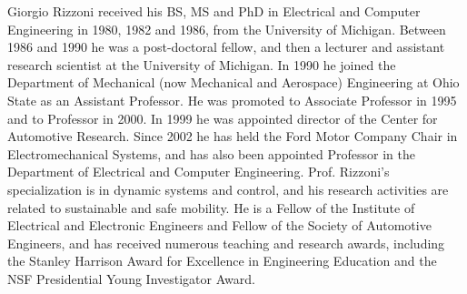 \documentclass[journal]{IEEEtran}
\begin{document}
\begin{IEEEbiography}[{\texttt{[image: GR]}}]{Giorgio Rizzoni} 
received his BS, MS and PhD in Electrical and Computer Engineering in 1980, 1982 and 1986, from the University of Michigan.  
Between 1986 and 1990 he was a post-doctoral fellow, and then a lecturer and assistant research scientist at the University of Michigan. In 1990 he joined the Department of Mechanical (now Mechanical and Aerospace) Engineering at Ohio State as an Assistant Professor. He was promoted to Associate Professor in 1995 and to Professor in 2000.  In 1999 he was appointed director of the Center for Automotive Research.  Since 2002 he has held the Ford Motor Company Chair in Electromechanical Systems, and has also been appointed Professor in the Department of Electrical and Computer Engineering. Prof. Rizzoni's specialization is in dynamic systems and control, and his research activities are related to sustainable and safe mobility. He is a Fellow of the Institute of Electrical and Electronic Engineers and Fellow of the Society of Automotive Engineers, and has received numerous teaching and research awards, including the Stanley Harrison Award for Excellence in Engineering Education and the NSF Presidential Young Investigator Award.
\end{IEEEbiography}
\end{document}
